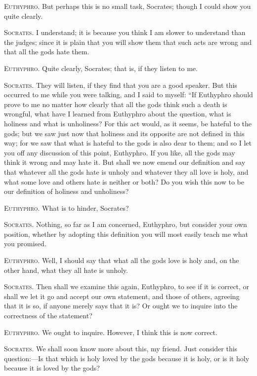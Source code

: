 \textsc{Euthyphro}. But perhaps this is no small task, Socrates;
though I could show you quite clearly.

\textsc{Socrates}. I understand; it is because you think I am slower
to understand than the judges; since it is plain that you will show
them that such acts are wrong and that all the gods hate them.

\textsc{Euthyphro}. Quite clearly, Socrates; that is, if they listen
to me.

\textsc{Socrates}. They will listen, if they find that you are a good
speaker. But this occurred to me while you were talking, and I said to
myself: ``If Euthyphro should prove to me no matter how clearly that
all the gods think such a death is wrongful, what have I learned from
Euthyphro about the question, what is holiness and what is unholiness?
For this act would, as it seems, be hateful to the gods; but we saw
just now that holiness and its opposite are not defined in this way;
for we saw that what is hateful to the gods is also dear to them; and
so I let you off any discussion of this point, Euthyphro. If you like,
all the gods may think it wrong and may hate it. But shall we now
emend our definition and  say that whatever all the gods hate
is unholy and whatever they all love is holy, and what some love and
others hate is neither or both? Do you wish this now to be our
definition of holiness and unholiness?

\textsc{Euthyphro}. What is to hinder, Socrates?

\textsc{Socrates}. Nothing, so far as I am concerned, Euthyphro, but
consider your own position, whether by adopting this definition you
will most easily teach me what you promised.

\textsc{Euthyphro}. Well, I should say that what all the gods love is
holy and, on the other hand, what they all hate is unholy.

\textsc{Socrates}. Then shall we examine this again, Euthyphro, to see
if it is correct, or shall we let it go and accept our own statement,
and those of others, agreeing that it is so, if anyone merely says
that it is? Or ought we to inquire into the correctness of the
statement?

\textsc{Euthyphro}. We ought to inquire. However, I think this is now
correct.

\textsc{Socrates}. We shall soon know more about this, my friend. Just
consider this question:---Is that which is holy loved by the gods
because it is holy, or is it holy because it is loved by the gods?

